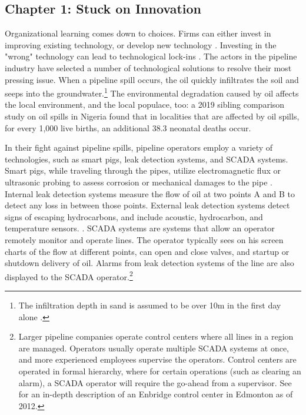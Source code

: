 \subsection{Chapter 1: Stuck on Innovation}

Organizational learning comes down to choices. Firms can either invest in improving existing technology, or develop new technology \citep{March1991}. Investing in the "wrong" technology can lead to technological lock-ins \citep{Levinthal1993}. The actors in the pipeline industry have selected a number of technological solutions to resolve their most pressing issue. When a pipeline spill occurs, the oil quickly infiltrates the soil and seeps into the groundwater.\footnote{The infiltration depth in sand is assumed to be over 10m in the first day alone \citep{Bonvicini2015}.} The environmental degradation caused by oil affects the local environment, and the local populace, too: a 2019 sibling comparison study on oil spills in Nigeria found that in localities that are affected by oil spills, for every 1,000 live births, an additional 38.3 neonatal deaths occur\citep{Bruederle2019}. %

In their fight against pipeline spills, pipeline operators employ a variety of technologies, such as smart pigs, leak detection systems, and SCADA systems. Smart pigs, while traveling through the pipes, utilize electromagnetic flux or ultrasonic probing to assess corrosion or mechanical damages to the pipe \citep{Singh2017-7}. Internal leak detection systems measure the flow of oil at two points A and B to detect any loss in between those points. External leak detection systems detect signs of escaping hydrocarbons, and include acoustic, hydrocarbon, and temperature sensors. \citep{Shaw2012}. SCADA systems are systems that allow an operator remotely monitor and operate lines. The operator typically sees on his screen charts of the flow at different points, can open and close valves, and startup or shutdown delivery of oil. Alarms from leak detection systems of the line are also displayed to the SCADA operator.\footnote{Larger pipeline companies operate control centers where all lines in a region are managed. Operators usually operate multiple SCADA systems at once, and more experienced employees supervise the operators. Control centers are operated in formal hierarchy, where for certain operations (such as clearing an alarm), a SCADA operator will require the go-ahead from a supervisor. See \citet{NTSB2012} for an in-depth description of an Enbridge control center in Edmonton as of 2012.}

